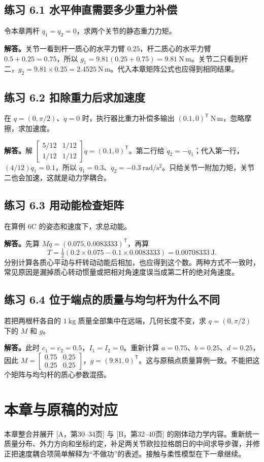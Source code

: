 \subsection*{练习 6.1 水平伸直需要多少重力补偿}
令本章两杆 $q_1=q_2=0$，求两个关节的静态重力力矩。

\textbf{解答。}关节一看到杆一质心的水平力臂 $0.25$，杆二质心的水平力臂 $0.5+0.25=0.75$，所以 $g_1=9.81(0.25+0.75)=9.81\ \mathrm{N\,m}$。关节二只看到杆二，$g_2=9.81\times0.25=2.4525\ \mathrm{N\,m}$。代入本章矩阵公式也应得到相同结果。

\subsection*{练习 6.2 扣除重力后求加速度}
在 $q=(0,\pi/2)$、$\dot q=0$ 时，执行器比重力补偿多输出 $(0.1,0)^{\mathsf T}\ \mathrm{N\,m}$，忽略摩擦，求加速度。

\textbf{解答。}解 $\begin{bmatrix}5/12&1/12\\1/12&1/12\end{bmatrix}\ddot q=(0.1,0)^{\mathsf T}$。第二行给 $\ddot q_2=-\ddot q_1$；代入第一行，$(4/12)\ddot q_1=0.1$，所以 $\ddot q_1=0.3$、$\ddot q_2=-0.3\ \mathrm{rad/s^2}$。只给关节一附加力矩，关节二也会加速，这就是动力学耦合。

\subsection*{练习 6.3 用动能检查矩阵}
在算例 6C 的姿态和速度下，求总动能。

\textbf{解答。}先算 $M\dot q=(0.075,0.0083333)^{\mathsf T}$，再算
\[
 T=\tfrac12(0.2\times0.075-0.1\times0.0083333)=0.00708333\ \mathrm J.
\]
分别计算各质心平动与杆转动动能后相加，也应得到这个数。两种方式不一致时，常见原因是漏掉质心转动惯量或把相对角速度误当成第二杆的绝对角速度。

\subsection*{练习 6.4 位于端点的质量与均匀杆为什么不同}
若把两根杆各自的 $1\ \mathrm{kg}$ 质量全部集中在远端，几何长度不变，求 $q=(0,\pi/2)$ 下的 $M$ 和 $g$。

\textbf{解答。}此时 $c_1=c_2=0.5$，$I_1=I_2=0$。重新计算 $a=0.75$、$b=0.25$、$d=0.25$，因此 $M=\begin{bmatrix}0.75&0.25\\0.25&0.25\end{bmatrix}$，$g=(9.81,0)^{\mathsf T}$。这与原稿点质量算例一致。不能把这个矩阵与均匀杆的质心参数混搭。

\section*{本章与原稿的对应}
本章整合并展开 [A，第30--34页] 与 [B，第32--40页] 的刚体动力学内容。重新统一质量分布、外力方向和坐标约定，补足两关节欧拉拉格朗日的中间求导步骤，并修正把速度耦合项简单解释为“不做功”的表述。接触与柔性模型在下一章继续。
